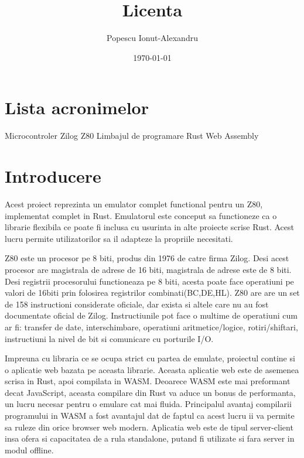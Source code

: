 \documentclass[titlepage]{article}
\begin{document}
\fontsize{12}{13.5}\selectfont
\title{Licenta}
\author{Popescu Ionut-Alexandru}
\date{\today}

\maketitle
\renewcommand{\contentsname}{Cuprins}
\renewcommand{\listfigurename}{Lista figurilor} 
\renewcommand{\listtablename}{Lista tabelelor}
\renewcommand{\figurename}{Figura}
\renewcommand{\tablename}{Tabela}
\tableofcontents
\clearpage  
\listoffigures
\clearpage
\listoftables
\clearpage
\section*{Lista acronimelor} %
\begin{acronym}  
           {Microcontroler Zilog Z80}
          {Limbajul de programare Rust}
          {Web Assembly}
    \end{acronym}
\clearpage

\section{Introducere}
Acest proiect reprezinta un emulator complet functional pentru un \ac {Z80}, implementat complet in \ac {Rust}.
Emulatorul este conceput sa functioneze ca o librarie flexibila ce poate fi inclusa cu usurinta in alte proiecte scrise Rust. Acest lucru permite utilizatorilor sa il adapteze la propriile necesitati.

\ac {Z80} este un procesor pe 8 biti, produs din 1976 de catre firma Zilog. Desi acest procesor are magistrala de adrese de 16 biti, magistrala de adrese este de 8 biti.
Desi registrii procesorului functioneaza pe 8 biti, acesta poate face operatiuni pe valori de 16biti prin folosirea registrilor combinati(BC,DE,HL).
Z80 are are un set de 158 instructioni considerate oficiale, dar exista si altele care nu au fost documentate oficial de Zilog. Instructiunile pot face o multime de operatiuni cum ar fi: transfer de date, interschimbare, operatiuni aritmetice/logice, rotiri/shiftari, instructiuni la nivel de bit si comunicare cu porturile I/O.

Impreuna cu libraria ce se ocupa strict cu partea de emulate, proiectul contine si o aplicatie web bazata pe aceasta librarie.
Aceasta aplicatie web este de asemenea scrisa in Rust, apoi compilata in \ac {WASM}. Deoarece \ac {WASM} este mai preformant decat JavaScript, aceasta compilare din Rust va aduce un bonus de performanta, un lucru necesar pentru o emulare cat mai fluida.
Principalul avantaj compilarii programului in \ac {WASM} a fost avantajul dat de faptul ca acest lucru ii va permite sa ruleze din orice browser web modern.
Aplicatia web este de tipul server-client insa ofera si capacitatea de a rula standalone, putand fi utilizate si fara server in modul offline.
\end{document}
